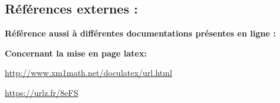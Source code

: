\documentclass{article}
\begin{document}
\vspace{0.5\baselineskip}

\subsection{Références externes :}

\vspace{1\baselineskip}

\bf Référence aussi à différentes documentations présentes en ligne :

\vspace{0.3\baselineskip}

\bf Concernant la mise en page latex:

\vspace{0.5\baselineskip}

\url{http://www.xm1math.net/doculatex/url.html}

\vspace{0.3\baselineskip}

\url{https://urlz.fr/8eFS}

\vspace{0.3\baselineskip}
\end{document}
